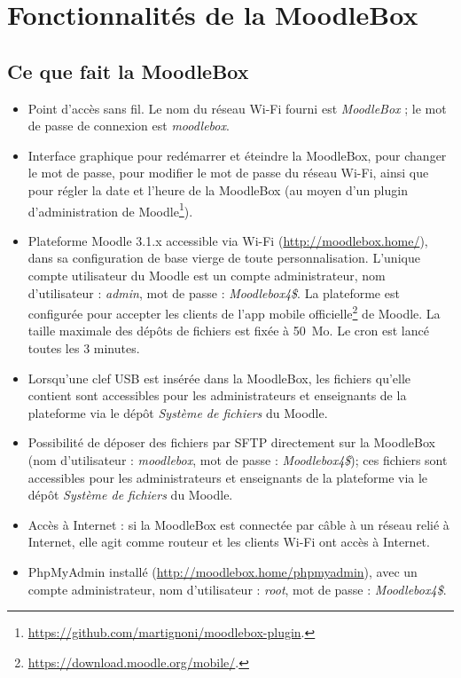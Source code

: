 \documentclass[11pt]{article}
\begin{document}
\section{Fonctionnalités de la MoodleBox}

\subsection{Ce que fait la MoodleBox}

\begin{itemize}
\item Point d'accès sans fil. Le nom du réseau Wi-Fi fourni est \emph{MoodleBox} ; le mot de passe de connexion est \emph{moodlebox}.
\item Interface graphique pour redémarrer et éteindre la MoodleBox, pour changer le mot de passe, pour modifier le mot de passe du réseau Wi-Fi, ainsi que pour régler la date et l'heure de la MoodleBox (au moyen d'un plugin d'administration de Moodle\footnote{\url{https://github.com/martignoni/moodlebox-plugin}.}).
\item Plateforme Moodle 3.1.x accessible via Wi-Fi (\url{http://moodlebox.home/}), dans sa configuration de base vierge de toute personnalisation. L'unique compte utilisateur du Moodle est un compte administrateur, nom d'utilisateur : \emph{admin}, mot de passe : \emph{Moodlebox4\$}. La plateforme est configurée pour accepter les clients de l'app mobile officielle\footnote{\url{https://download.moodle.org/mobile/}.} de Moodle. La taille maximale des dépôts de fichiers est fixée à 50~Mo. Le cron est lancé toutes les 3 minutes.
\item Lorsqu'une clef USB est insérée dans la MoodleBox, les fichiers qu'elle contient sont accessibles pour les administrateurs et enseignants de la plateforme via le dépôt \emph{Système de fichiers} du Moodle.
\item Possibilité de déposer des fichiers par SFTP directement sur la MoodleBox (nom d'utilisateur : \emph{moodlebox}, mot de passe : \emph{Moodlebox4\$}); ces fichiers sont accessibles pour les administrateurs et enseignants de la plateforme via le dépôt \emph{Système de fichiers} du Moodle.
\item Accès à Internet : si la MoodleBox est connectée par câble à un réseau relié à Internet, elle agit comme routeur et les clients Wi-Fi ont accès à Internet.
\item PhpMyAdmin installé (\url{http://moodlebox.home/phpmyadmin}), avec un compte administrateur, nom d'utilisateur : \emph{root}, mot de passe : \emph{Moodlebox4\$}.
\end{itemize}
\end{document}
